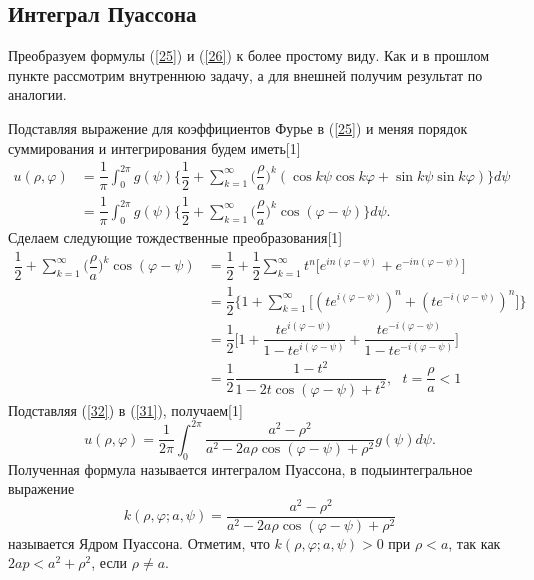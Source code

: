 \documentclass[14pt, a4paper]{extarticle}
\let\oldref\ref
\renewcommand{\ref}[1]{(\oldref{#1})}
\begin{document}
	  			\subsection{Интеграл Пуассона}
	  				Преобразуем формулы \ref{25} и \ref{26}  к более простому виду. Как и в прошлом пункте рассмотрим внутреннюю задачу, а для внешней получим результат по аналогии. 
	  				
	  				Подставляя выражение для коэффициентов Фурье в \ref{25} и меняя порядок суммирования и интегрирования будем иметь[1]
	  				\begin{align}
  						u(\rho, \varphi) &= \dfrac{1}{\pi} \int_{0}^{2\pi} g(\psi) \Bigg\{  \dfrac{1}{2} + \sum_{k=1}^{\infty} \bigg( \dfrac{\rho}{a} \bigg)^k   (\cos{k\psi}  \cos{k\varphi} + \sin{k\psi} \sin{k\varphi}) \Bigg \}  d\psi\nonumber \\
  						&= \dfrac{1}{\pi} \int_{0}^{2\pi} g(\psi) \Bigg\{ \dfrac{1}{2}  + \sum_{k=1}^{\infty}  \bigg( \dfrac{\rho}{a} \bigg)^k \cos{(\varphi - \psi)} \Bigg\} d\psi . \label{31}
  					\end{align}
  					Сделаем следующие тождественные преобразования[1]
  					\begin{align}
						 \dfrac{1}{2}  + \sum_{k=1}^{\infty}  \bigg( \dfrac{\rho}{a} \bigg)^k \cos{(\varphi - \psi)} &= \dfrac{1}{2} + \dfrac{1}{2} \sum_{k=1}^{\infty} t^n \big[  e^{in(\varphi - \psi)} + e^{-in(\varphi - \psi)} \big] \nonumber \\ 
						 &= \dfrac{1}{2} \Bigg\{ 1 +  \sum_{k=1}^{\infty} \big[  (te^{i(\varphi - \psi)})^n + (te^{-i(\varphi - \psi)})^n \big] \Bigg\}  \nonumber \\
						 &=  \dfrac{1}{2} \bigg[  1 + \dfrac{te^{i(\varphi - \psi)}}{1 - te^{i(\varphi - \psi)}} +   \dfrac{te^{-i(\varphi - \psi)}}{1 - te^{-i(\varphi - \psi)}} \bigg]  \nonumber  \\ 
						 &= \dfrac{1}{2} \dfrac{1-t^2}{1 - 2t\cos{(\varphi - \psi)+t^2}}, \:\:\: t = \dfrac{\rho}{a}< 1  \label{32}
  					\end{align}
  					Подставляя \ref{32} в \ref{31}, получаем[1]
  					\begin{equation}
						u(\rho, \varphi) = \dfrac{1}{2\pi} \int_{0}^{2\pi} \dfrac{a^2-\rho^2}{a^2 - 2a\rho \cos(\varphi - \psi) + \rho^2} g(\psi) d\psi. \label{33}
					\end{equation} 					
					Полученная формула называется интегралом Пуассона, в подыинтегральное выражение
					\begin{equation}
						k(\rho, \varphi; a, \psi ) = \dfrac{a^2-\rho^2}{a^2 - 2a\rho \cos(\varphi - \psi) + \rho^2}
					\end{equation}
					называется Ядром Пуассона. Отметим, что $	k(\rho, \varphi; a, \psi ) > 0$ при $\rho < a$, так как $2ap < a^2 + \rho^2$, если $\rho \neq a$.
					
\end{document}
